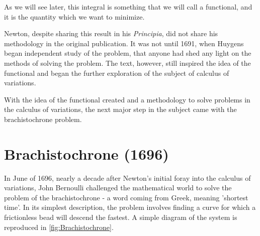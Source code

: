 As we will see later, this integral is something that we will call a \gls{functional}, and it is the quantity which we want to minimize. 

Newton, despite sharing this result in his \textit{Principia}, did not share his methodology in the original publication. It was not until 1691, when Huygens began independent study of the problem, that anyone had shed any light on the methods of solving the problem. The text, however, still inspired the idea of the functional and began the further exploration of the subject of calculus of variations.

With the idea of the functional created and a methodology to solve problems in the calculus of variations, the next major step in the subject came with the \gls{brachistochrone} problem.

\section{Brachistochrone (1696)}

In June of 1696, nearly a decade after Newton's initial foray into the calculus of variations, John Bernoulli challenged the mathematical world to solve the problem of the \gls{brachistochrone} - a word coming from Greek, meaning 'shortest time'. In its simplest description, the problem involves finding a curve for which a frictionless bead will descend the fastest. A simple diagram of the system is reproduced in \autoref{fig:Brachistochrone}. 

